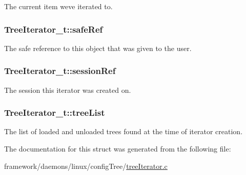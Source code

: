 The current item we\textquotesingle{}ve iterated to. 

\subsubsection[{\texorpdfstring{safe\+Ref}{safeRef}}]{ Tree\+Iterator\+\_\+t\+::safe\+Ref}\hypertarget{struct_tree_iterator__t_af1e45b887ad102ea832cc39d37de981d}{}\label{struct_tree_iterator__t_af1e45b887ad102ea832cc39d37de981d}
The safe reference to this object that was given to the user. 
\subsubsection[{\texorpdfstring{session\+Ref}{sessionRef}}]{ Tree\+Iterator\+\_\+t\+::session\+Ref}\hypertarget{struct_tree_iterator__t_af7f654c83f0817840efe7e783db1dfd8}{}\label{struct_tree_iterator__t_af7f654c83f0817840efe7e783db1dfd8}


The session this iterator was created on. 

\subsubsection[{\texorpdfstring{tree\+List}{treeList}}]{ Tree\+Iterator\+\_\+t\+::tree\+List}\hypertarget{struct_tree_iterator__t_a0715de82fec518e7e68a8ca8737df68b}{}\label{struct_tree_iterator__t_a0715de82fec518e7e68a8ca8737df68b}
The list of loaded and unloaded trees found at the time of iterator creation. 

The documentation for this struct was generated from the following file\+:\begin{DoxyCompactItemize}
\item 
framework/daemons/linux/config\+Tree/\hyperlink{tree_iterator_8c}{tree\+Iterator.\+c}\end{DoxyCompactItemize}
